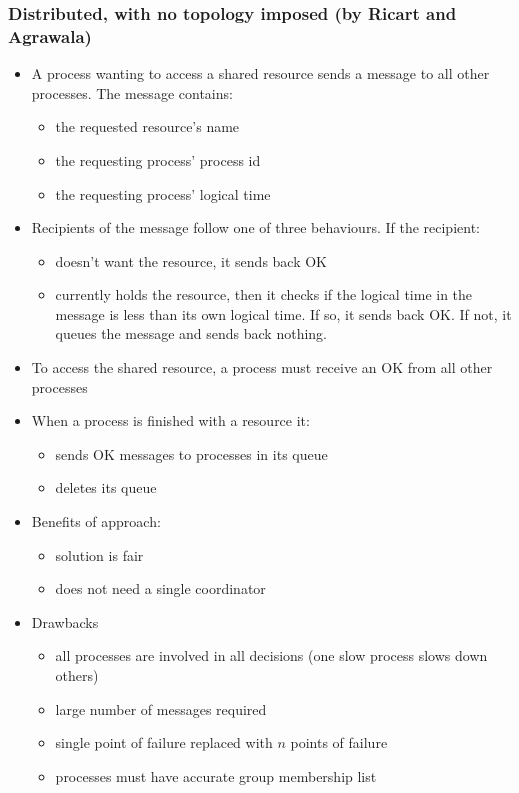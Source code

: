 \subsubsection{Distributed, with no topology imposed (by Ricart and Agrawala)}
\begin{itemize}
	\item A process wanting to access a shared resource sends a message to all other processes. The message contains:
	\begin{itemize}
		\item the requested resource's name
		\item the requesting process' process id
		\item the requesting process' logical time
	\end{itemize}
	\item Recipients of the message follow one of three behaviours. If the recipient:
	\begin{itemize}
		\item doesn't want the resource, it sends back OK
		\item currently holds the resource, then it checks if the logical time in the message is less than its own logical time. If so, it sends back OK. If not, it queues the message and sends back nothing.
	\end{itemize}
	\item To access the shared resource, a process must receive an OK from all other processes
	\item When a process is finished with a resource it:
	\begin{itemize}
		\item sends OK messages to processes in its queue
		\item deletes its queue
	\end{itemize}
	\item Benefits of approach:
	\begin{itemize}
		\item solution is fair
		\item does not need a single coordinator
	\end{itemize}
	\item Drawbacks
	\begin{itemize}
		\item all processes are involved in all decisions (one slow process slows down others)
		\item large number of messages required
		\item single point of failure replaced with $n$ points of failure
		\item processes must have accurate group membership list
	\end{itemize}	
\end{itemize}


